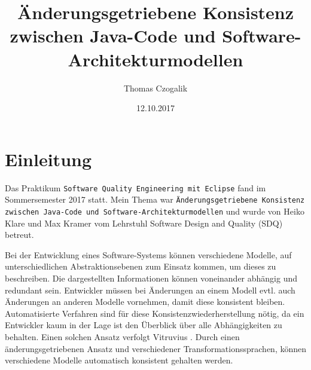 \documentclass[ngerman,runningheads]{llncs}
\begin{document}
\mainmatter
\title{Änderungsgetriebene Konsistenz zwischen Java-Code und Software-Architekturmodellen}
 \author{Thomas Czogalik}
\date{12.10.2017}
\maketitle


\section{Einleitung}
Das Praktikum \texttt{Software Quality Engineering mit Eclipse} fand im Sommersemester 2017 statt. Mein Thema war \texttt{Änderungsgetriebene Konsistenz zwischen Java-Code und Software-Architekturmodellen} und wurde von Heiko Klare und Max Kramer vom Lehrstuhl Software Design and Quality (SDQ) betreut. \par
Bei der Entwicklung eines Software-Systems können verschiedene Modelle, auf unterschiedlichen Abstraktionsebenen zum Einsatz kommen, um dieses zu beschreiben. Die dargestellten Informationen können voneinander abhängig und redundant sein. Entwickler müssen bei Änderungen an einem Modell evtl. auch Änderungen an anderen Modelle vornehmen, damit diese konsistent bleiben. Automatisierte Verfahren sind für diese Konsistenzwiederherstellung nötig, da ein Entwickler kaum in der Lage ist den Überblick über alle Abhängigkeiten zu behalten. Einen solchen Ansatz verfolgt Vitruvius \cite{kramer2013b}. Durch einen änderungsgetriebenen Ansatz und verschiedener Transformationssprachen, können verschiedene Modelle automatisch konsistent gehalten werden.
\end{document}
